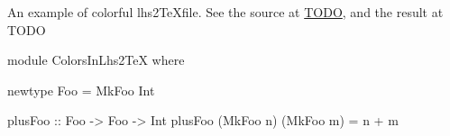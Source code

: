 \documentclass{article}
\begin{document}
An example of colorful lhs2\TeX file.
See the source at \url{TODO}, and the result at {TODO}

\begin{code}
module ColorsInLhs2TeX where

newtype Foo = MkFoo Int

plusFoo :: Foo -> Foo -> Int
plusFoo (MkFoo n) (MkFoo m) = n + m
\end{code}
\end{document}
